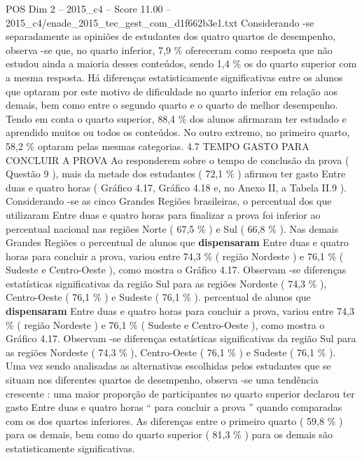 \begin{textsample}{POS Dim 2 – 2015\_c4 – Score 11.00 – 2015\_c4/enade\_2015\_tec\_gest\_com\_d1f662b3e1.txt}
Considerando -se separadamente as opiniões de estudantes dos quatro quartos de desempenho, observa -se que, no quarto inferior, 7,9 \% ofereceram como resposta que não estudou ainda a maioria desses conteúdos, sendo 1,4 \% os do quarto superior com a mesma resposta.
Há diferenças estatisticamente significativas entre os alunos que optaram por este motivo de dificuldade no quarto inferior em relação aos demais, bem como entre o segundo quarto e o quarto de melhor desempenho.
Tendo em conta o quarto superior, 88,4 \% dos alunos afirmaram ter estudado e aprendido muitos ou todos os conteúdos.
No outro extremo, no primeiro quarto, 58,2 \% optaram pelas mesmas categorias. 4.7 TEMPO GASTO PARA CONCLUIR A PROVA Ao responderem sobre o tempo de conclusão da prova ( Questão 9 ), mais da metade dos estudantes ( 72,1 \% ) afirmou ter gasto Entre duas e quatro horas ( Gráfico 4.17, Gráfico 4.18 e, no Anexo II, a Tabela II.9 ).
Considerando -se as cinco Grandes Regiões brasileiras, o percentual dos que utilizaram Entre duas e quatro horas para finalizar a prova foi inferior ao percentual nacional nas regiões Norte ( 67,5 \% ) e Sul ( 66,8 \% ).
Nas demais Grandes Regiões o percentual de alunos que \textbf{dispensaram} Entre duas e quatro horas para concluir a prova, variou entre 74,3 \% ( região Nordeste ) e 76,1 \% ( Sudeste e Centro-Oeste ), como mostra o Gráfico 4.17.
Observam -se diferenças estatísticas significativas da região Sul para as regiões Nordeste ( 74,3 \% ), Centro-Oeste ( 76,1 \% ) e Sudeste ( 76,1 \% ). percentual de alunos que \textbf{dispensaram} Entre duas e quatro horas para concluir a prova, variou entre 74,3 \% ( região Nordeste ) e 76,1 \% ( Sudeste e Centro-Oeste ), como mostra o Gráfico 4.17.
Observam -se diferenças estatísticas significativas da região Sul para as regiões Nordeste ( 74,3 \% ), Centro-Oeste ( 76,1 \% ) e Sudeste ( 76,1 \% ).
Uma vez sendo analisadas as alternativas escolhidas pelos estudantes que se situam nos diferentes quartos de desempenho, observa -se uma tendência crescente : uma maior proporção de participantes no quarto superior declarou ter gasto Entre duas e quatro horas “ para concluir a prova ” quando comparadas com os dos quartos inferiores.
As diferenças entre o primeiro quarto ( 59,8 \% ) para os demais, bem como do quarto superior ( 81,3 \% ) para os demais são estatisticamente significativas.

\end{textsample}
